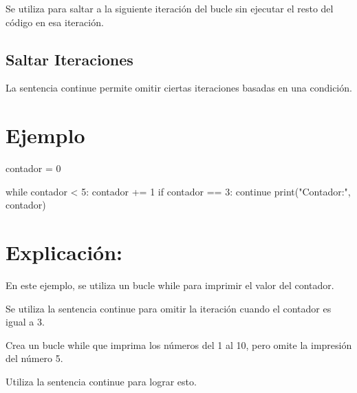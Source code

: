 \documentclass[
  a4paper,
  DIV=11,
  numbers=noendperiod,
  onepage,
  openany]{scrreprt}
\newenvironment{Shaded}{\begin{snugshade}}{\end{snugshade}}
\newcommand{\BuiltInTok}[1]{\textcolor[rgb]{0.00,0.23,0.31}{#1}}
\newcommand{\ControlFlowTok}[1]{\textcolor[rgb]{0.00,0.23,0.31}{#1}}
\newcommand{\DecValTok}[1]{\textcolor[rgb]{0.68,0.00,0.00}{#1}}
\newcommand{\NormalTok}[1]{\textcolor[rgb]{0.00,0.23,0.31}{#1}}
\newcommand{\OperatorTok}[1]{\textcolor[rgb]{0.37,0.37,0.37}{#1}}
\newcommand{\StringTok}[1]{\textcolor[rgb]{0.13,0.47,0.30}{#1}}
\begin{document}
Se utiliza para saltar a la siguiente iteración del bucle sin ejecutar
el resto del código en esa iteración.

\hypertarget{saltar-iteraciones}{%
\subsection{Saltar Iteraciones}\label{saltar-iteraciones}}

La sentencia continue permite omitir ciertas iteraciones basadas en una
condición.

\hypertarget{ejemplo-40}{%
\section{Ejemplo}\label{ejemplo-40}}

\begin{Shaded}
\begin{Highlighting}[]
\NormalTok{contador }\OperatorTok{=} \DecValTok{0}

\ControlFlowTok{while}\NormalTok{ contador }\OperatorTok{\textless{}} \DecValTok{5}\NormalTok{:}
\NormalTok{    contador }\OperatorTok{+=} \DecValTok{1}
    \ControlFlowTok{if}\NormalTok{ contador }\OperatorTok{==} \DecValTok{3}\NormalTok{:}
        \ControlFlowTok{continue}
    \BuiltInTok{print}\NormalTok{(}\StringTok{"Contador:"}\NormalTok{, contador)}
\end{Highlighting}
\end{Shaded}

\hypertarget{explicaciuxf3n-40}{%
\section{Explicación:}\label{explicaciuxf3n-40}}

En este ejemplo, se utiliza un bucle while para imprimir el valor del
contador.

Se utiliza la sentencia continue para omitir la iteración cuando el
contador es igual a 3.

\begin{tcolorbox}[enhanced jigsaw, colbacktitle=quarto-callout-important-color!10!white, toprule=.15mm, leftrule=.75mm, titlerule=0mm, opacityback=0, rightrule=.15mm, opacitybacktitle=0.6, breakable, left=2mm, coltitle=black, title=\textcolor{quarto-callout-important-color}{\faExclamation}\hspace{0.5em}{Actividad Práctica:}, toptitle=1mm, bottomtitle=1mm, arc=.35mm, bottomrule=.15mm, colback=white, colframe=quarto-callout-important-color-frame]

Crea un bucle while que imprima los números del 1 al 10, pero omite la
impresión del número 5.

Utiliza la sentencia continue para lograr esto.

\end{tcolorbox}
\end{document}
